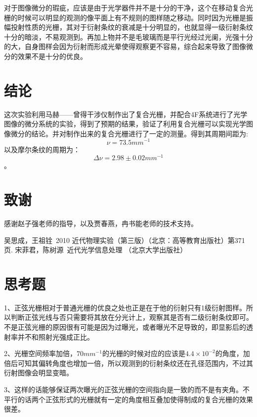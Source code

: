 \documentclass[aps,pre,12pt,preprint,onecolumn,showpacs,showkeys,UTF8]{revtex4-1}
\begin{document}
对于图像微分的瑕疵，应该是由于光学器件并不是十分的干净，这个在移动复合光栅的时候可以明显的观测的像平面上有不规则的图样随之移动。同时因为光栅是振幅投射性质的光栅，其对于衍射条纹的衰减是十分明显的，也就显得一级衍射条纹十分的暗淡，不易观测到。再加上物并不是毛玻璃而是平行光经过光阑，光强十分的大，自身图样会因为衍射而形成光晕使得观察更不容易，综合起来导致了图像微分的效果不是十分的优良。

\section{结论}

这次实验利用马赫——曾得干涉仪制作出了复合光栅，并配合4F系统进行了光学图像的微分系统的实验，得到了预期的结果，验证了利用复合光栅可以实现光学图像微分的结论。并对制作出来的复合光栅进行了一定的测量。得到其周期间距为:
$$\nu=73.5mm^{-1}$$
以及摩尔条纹的周期为：
$$\Delta\nu=2.98 \pm 0.02 mm^{-1}$$。

 
\section{致谢}
感谢赵子强老师的指导，以及贾春燕，冉书能老师的技术支持。



\begin{thebibliography}{}
	 吴思成，王祖铨~2010 近代物理实验（第三版）（北京：高等教育出版社）第371页.
	 宋菲君，陈树源~近代光学信息处理 （北京大学出版社） 
%
%
\end{thebibliography}

\clearpage
\appendix
\section{思考题}

	1、正弦光栅相对于普通光栅的优良之处也正是在于他的衍射只有1级衍射图样。所以判断正弦光线与否只需要将其放在分光计上，观察其是否有二级衍射条纹即可。不是正弦光栅的原因很有可能是因为过曝光，或者曝光不足导致的，即显影后的透射率并不和照射光强成正比。

	2、光栅空间频率加倍，$70mm^{-1}$的光栅的时候对应的应该是$4.4\times10^{-2}$的角度，加倍后可知其偏转角度也增加一倍，所以观测到的衍射条纹还在孔径范围内，不过其衍射图像会明显变暗。

	3、这样的话能够保证两次曝光的正弦光栅的空间指向是一致的而不是有夹角。不平行的话两个正弦形式的光栅就有一定的角度相互叠加使得制成的复合光栅的效果很差。
\end{document}
